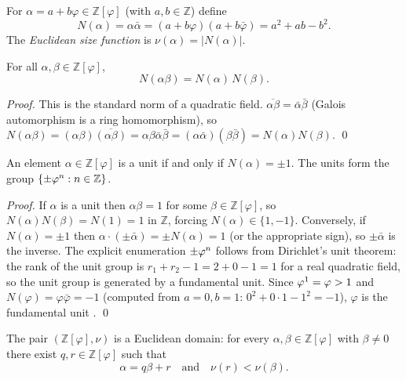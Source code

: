 \begin{definition}\label{def:gs-norm}
For \(\alpha = a + b\varphi \in \mathbb{Z}[\varphi]\) (with \(a,b
\in \mathbb{Z}\)) define
\[
  N(\alpha) = \alpha\bar\alpha = (a+b\varphi)(a+b\bar\varphi)
            = a^2 + ab - b^2 .
\]
The \emph{Euclidean size function} is \(\nu(\alpha) = |N(\alpha)|\).
\end{definition}

\begin{lemma}\label{lem:gs-normMult}
For all \(\alpha, \beta \in \mathbb{Z}[\varphi]\),
\[
  N(\alpha\beta) = N(\alpha)\, N(\beta) .
\]
\end{lemma}

\begin{proof}
This is the standard norm of a quadratic field.
\(\overline{\alpha\beta} = \bar\alpha\bar\beta\) (Galois automorphism
is a ring homomorphism), so
\(N(\alpha\beta) = (\alpha\beta)\overline{(\alpha\beta)} =
\alpha\beta\bar\alpha\bar\beta = (\alpha\bar\alpha)(\beta\bar\beta) =
N(\alpha)N(\beta)\).
\qed
\end{proof}

\begin{lemma}\label{lem:gs-units}
An element \(\alpha \in \mathbb{Z}[\varphi]\) is a unit if and only if
\(N(\alpha) = \pm 1\).  The units form the group
\(\{ \pm\varphi^{n} : n \in \mathbb{Z} \}\).
\end{lemma}

\begin{proof}
If \(\alpha\) is a unit then \(\alpha\beta = 1\) for some
\(\beta \in \mathbb{Z}[\varphi]\), so \(N(\alpha)N(\beta) = N(1) = 1\)
in \(\mathbb{Z}\), forcing \(N(\alpha) \in \{1,-1\}\).  Conversely,
if \(N(\alpha) = \pm 1\) then \(\alpha \cdot (\pm\bar\alpha) = \pm
N(\alpha) = 1\) (or the appropriate sign), so \(\pm\bar\alpha\) is
the inverse. The explicit enumeration \(\pm\varphi^{n}\) follows from
Dirichlet's unit theorem: the rank of the unit group is \(r_1 + r_2 - 1
= 2 + 0 - 1 = 1\) for a real quadratic field, so the unit group is
generated by a fundamental unit.  Since \(\varphi^{1} = \varphi > 1\)
and \(N(\varphi) = \varphi\bar\varphi = -1\) (computed from
\(a=0, b=1\): \(0^2 + 0 \cdot 1 - 1^2 = -1\)), \(\varphi\) is the
fundamental unit \cite{ireland_rosen}.
\qed
\end{proof}

\begin{theorem}\label{thm:gs-euclidean}
The pair \((\mathbb{Z}[\varphi], \nu)\) is a Euclidean domain: for
every \(\alpha, \beta \in \mathbb{Z}[\varphi]\) with \(\beta \ne 0\)
there exist \(q, r \in \mathbb{Z}[\varphi]\) such that
\[
  \alpha = q\beta + r \quad \text{and} \quad \nu(r) < \nu(\beta) .
\]
\end{theorem}


